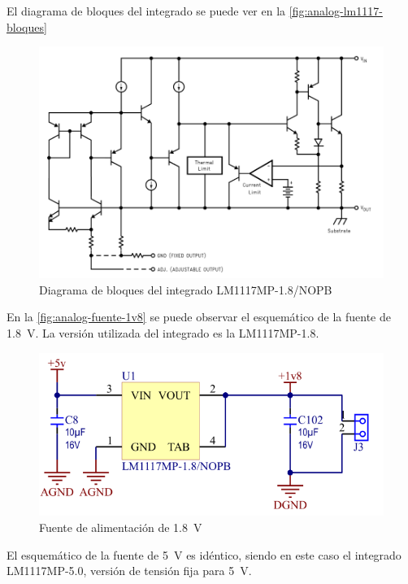 \documentclass[titlepage, 12pt]{article}
\begin{document}
      El diagrama de bloques del integrado se puede ver en la \autoref{fig:analog-lm1117-bloques}

          \begin{figure}[!htbp]
              \centering
              \includegraphics[scale=0.6]{images/analog-lm1117-bloques.png}
              \caption{Diagrama de bloques del integrado LM1117MP-1.8/NOPB}
              \label{fig:analog-lm1117-bloques}
          \end{figure}

      En la \autoref{fig:analog-fuente-1v8} se puede observar el esquemático de la fuente de \SI{1.8}{V}. La versión utilizada del integrado es la LM1117MP-1.8.

          \begin{figure}[!htbp]
              \centering
              \includegraphics[scale=0.6]{images/analog-fuente-1v8.png}
              \caption{Fuente de alimentación de \SI{1.8}{V}}
              \label{fig:analog-fuente-1v8}
          \end{figure}

      El esquemático de la fuente de \SI{5}{V} es idéntico, siendo en este caso el integrado LM1117MP-5.0, versión de tensión fija para \SI{5}{V}.
\end{document}
